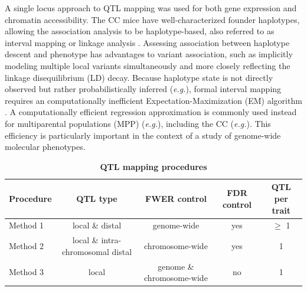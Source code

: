 \documentclass[9pt,twocolumn,twoside]{gsajnl}
\newcommand{\eg}{\emph{e.g.}}
\begin{document}
A single locus approach to QTL mapping was used for both gene expression and chromatin accessibility. The CC mice have well-characterized founder haplotypes, allowing the association analysis to be haplotype-based, also referred to as interval mapping or linkage analysis \citep{Lander1989}. Assessing association between haplotype descent and phenotype has advantages to variant association, such as implicitly modeling multiple local variants simultaneously and more closely reflecting the linkage disequilibrium (LD) decay. Because haplotype state is not directly observed but rather probabilistically inferred (\eg \citealt{Lander1987,Mott2000,Liu2010,Fu2012,Gatti2014,Zheng2015}), formal interval mapping requires an computationally inefficient Expectation-Maximization (EM) algorithm \citep{Dempster1977}. A computationally efficient regression approximation \citep{Haley1992,Martinez1992} is commonly used instead for multiparental populations (MPP) (\eg \citealt{Valdar2006a,Valdar2009,Svenson2012,Baud2013,Baud2014}), including the CC (\eg \citealt{Aylor2011,Kelada2016,Mosedale2017,Donoghue2017}). This efficiency is particularly important in the context of a study of genome-wide molecular phenotypes.

\begin{table}[h]
\renewcommand{\familydefault}{\sfdefault}\normalfont
\begin{tableminipage}{\textwidth}
\captionsetup{width=\textwidth}
\centering
\caption{\bf QTL mapping procedures
\label{tab:qtl_procedures}}
\end{tableminipage}
\begin{tableminipage}{\textwidth}
\begin{tabularx}{\textwidth}{l | cccc}
\hline 
Procedure & QTL type & FWER control & FDR control & QTL per trait \\
\hline
Method 1 & local \& distal & genome-wide & yes & $\ge$ 1 \\
Method 2 & local \& intra-chromosomal distal & chromosome-wide & yes & 1 \\
Method 3 & local & genome \& chromosome-wide & no & 1 \\
\hline
\end{tabularx}
\end{tableminipage}
\end{table}
\end{document}
